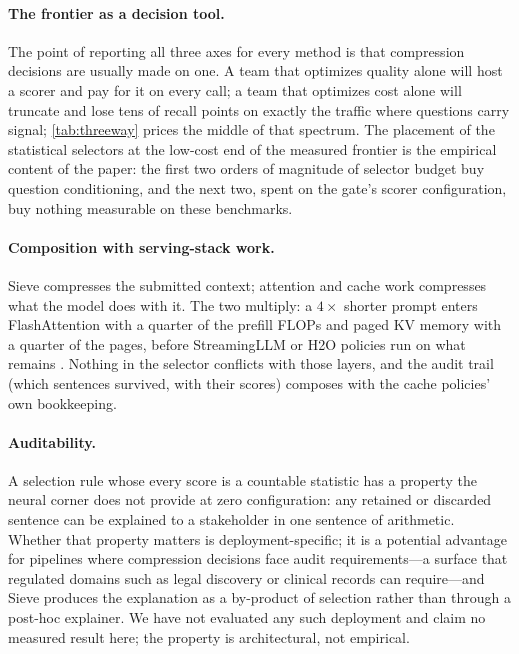 \documentclass[pdflatex,sn-basic]{sn-jnl}
\theoremstyle{remark}
\newcommand{\method}{Sieve}
\begin{document}
\paragraph{The frontier as a decision tool.}
The point of reporting all three axes for every method is that
compression decisions are usually made on one. A team that optimizes
quality alone will host a scorer and pay for it on every call; a team
that optimizes cost alone will truncate and lose tens of recall
points on exactly the traffic where questions carry signal;
\autoref{tab:threeway} prices the middle of that spectrum. The
placement of the statistical selectors at the low-cost end of the
measured frontier is the empirical content of the paper: the first
two orders of magnitude of selector budget buy question conditioning,
and the next two, spent on the gate's scorer configuration, buy
nothing measurable on these benchmarks.

\paragraph{Composition with serving-stack work.}
\method{} compresses the submitted context; attention and cache work
compresses what the model does with it. The two multiply: a
$4\times$ shorter prompt enters FlashAttention
\citep{dao2022flashattention} with a quarter of the prefill FLOPs and
paged KV memory \citep{kwon2023vllm} with a quarter of the pages,
before StreamingLLM or H2O policies run on what remains
\citep{xiao2023streaming,zhang2023h2o}. Nothing in the selector
conflicts with those layers, and the audit trail (which sentences
survived, with their scores) composes with the cache policies' own
bookkeeping.

\paragraph{Auditability.}
A selection rule whose every score is a countable statistic has a
property the neural corner does not provide at zero configuration: any retained
or discarded sentence can be explained to a stakeholder in one
sentence of arithmetic. Whether that property matters is
deployment-specific; it is a potential advantage for pipelines where
compression decisions face audit requirements---a surface that
regulated domains such as legal discovery or clinical records can
require---and \method{} produces the explanation as a by-product of
selection rather than through a post-hoc explainer. We have not
evaluated any such deployment and claim no measured result here; the
property is architectural, not empirical.
\end{document}
